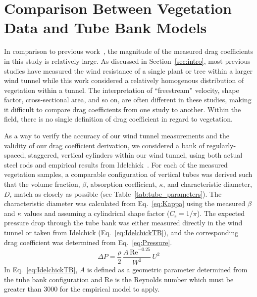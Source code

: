 \documentclass[12pt]{article}
\begin{document}
\section{Comparison Between Vegetation Data and Tube Bank Models}
\label{sec:comp}

In comparison to previous work~\cite{Cao2012,Jalonen2014,Mayhead1973,Gillies2002,Ishikawa2006}, the magnitude of the measured drag coefficients in this study is relatively large. As discussed in Section~\ref{sec:intro}, most previous studies have measured the wind resistance of a single plant or tree within a larger wind tunnel while this work considered a relatively homogenous distribution of vegetation within a tunnel. The interpretation of ``freestream'' velocity, shape factor, cross-sectional area, and so on, are often different in these studies, making it difficult to compare drag coefficients from one study to another. Within the field, there is no single definition of drag coefficient in regard to vegetation.

As a way to verify the accuracy of our wind tunnel measurements and the validity of our drag coefficient derivation, we considered a bank of regularly-spaced, staggered, vertical cylinders within our wind tunnel, using both actual steel rods and empirical results from Idelchick~\cite{Idelchick1994}. For each of the measured vegetation samples, a comparable configuration of vertical tubes was derived such that the volume fraction, $\beta$, absorption coefficient, $\kappa$, and characteristic diameter, $D$, match as closely as possible (see Table~\ref{tab:tube_parameters}). The characteristic diameter was calculated from Eq.~\ref{eq:Kappa} using the measured $\beta$ and $\kappa$ values and assuming a cylindrical shape factor ($C_{\mathrm{s}} = 1/\pi$). The expected pressure drop through the tube bank was either measured directly in the wind tunnel or taken from Idelchick (Eq.~\ref{eq:IdelchickTB}), and the corresponding drag coefficient was determined from Eq.~\ref{eq:Pressure}.
\begin{equation}
\label{eq:IdelchickTB}
\Delta P = \frac{\rho}{2}\,\frac{A\, \mathrm{Re}^{-0.25}}{W^{2}}\, U^2
\end{equation}
In Eq.~\ref{eq:IdelchickTB}, $A$ is defined as a geometric parameter determined from the tube bank configuration and Re is the Reynolds number which must be greater than 3000 for the empirical model to apply.
\end{document}
